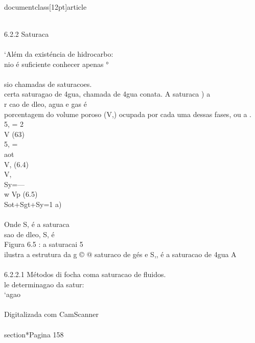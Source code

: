 \\documentclass[12pt]{article}
\begin{document}
\\
6.2.2 Saturaca\\
\\
‘Além da existéncia de hidrocarbo:\\
nio é suficiente conhecer apenas °\\
\\
sio chamadas de saturacoes.\\
certa saturagao de 4gua, chamada de 4gua conata. A saturaca ) a\\
r cao de dleo, agua e gas é\\
porcentagem do volume poroso (V,) ocupada por cada uma dessas fases, ou a .\\
5, = 2\\
V (63)\\
5, =\\
aot\\
V, (6.4)\\
V,\\
Sy=—\\
w Vp (6.5)\\
Sot+Sgt+Sy=1 a)\\
\\
Onde S, é a saturaca\\
sao de dleo, S, é\\
Figura 6.5 : a saturacai 5\\
ilustra a estrutura da g © @ saturaco de gés e S,, é a saturacao de 4gua A\\
\\
6.2.2.1 Métodos di focha coma saturacao de fluidos.\\
le determinagao da satur:\\
‘agao\\
\\
Digitalizada com CamScanner\\

\\section*{Pagina 158}
\end{document}
